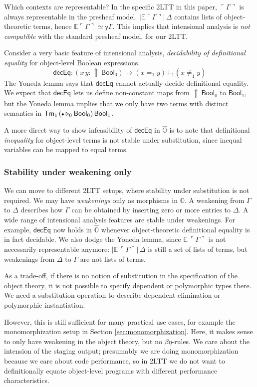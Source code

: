 \documentclass[acmsmall,review]{acmart}
\newcommand{\msf}[1]{\mathsf{#1}}
\newcommand{\mbb}[1]{\mathbb{#1}}
\newcommand{\ext}{\triangleright}
\newcommand{\Lift}{{\Uparrow}}
\newcommand{\mbbo}{\mbb{O}}
\newcommand{\Tm}{\msf{Tm}}
\newcommand{\Bool}{\msf{Bool}}
\newcommand{\emptycon}{\scaleobj{.75}\bullet}
\newcommand{\emb}[1]{\ulcorner#1\urcorner}
\newcommand{\hato}{\bm\hat{\mbbo}}
\newcommand{\ev}{\mbb{E}}
\theoremstyle{remark}
\newcommand{\yon}{\msf{y}}
\begin{document}
Which contexts are representable? In the specific 2LTT in this paper,
$\emb{\Gamma}$ is always representable in the presheaf
model. $|\ev{\emb{\Gamma}}|\,\Delta$ contains lists of object-theoretic terms,
hence $\ev{\emb{\Gamma}} \simeq \yon \Gamma$.  This implies that intensional
analysis is \emph{not compatible} with the standard presheaf model, for our
2LTT.

Consider a very basic feature of intensional analysis, \emph{decidability of
definitional equality} for object-level Boolean expressions.
\[
  \msf{decEq} : (x\,y : \Lift\,\Bool_0) \to (x =_1 y) +_1 (x \neq_1 y)
\]
The Yoneda lemma says that $\msf{decEq}$ cannot actually decide
definitional equality. We expect that $\msf{decEq}$ lets us define non-constant
maps from $\Lift\,\Bool_0$ to $\Bool_1$, but the Yoneda lemma implies that we
only have two terms with distinct semantics in $\Tm_1\,(\emptycon \ext_0
\Bool_0)\,\Bool_1$.

A more direct way to show infeasibility of $\msf{decEq}$ in $\hato$ is to note
that definitional \emph{inequality} for object-level terms is not stable under
substitution, since inequal variables can be mapped to equal terms.

\subsubsection{Stability under weakening only}
We can move to different 2LTT setups, where stability under substitution is not
required. We may have \emph{weakenings} only as morphisms in $\mbbo$.  A
weakening from $\Gamma$ to $\Delta$ describes how $\Gamma$ can be obtained by
inserting zero or more entries to $\Delta$. A wide range of intensional analysis
features are stable under weakenings. For example, $\msf{decEq}$ now holds in
$\hato$ whenever object-theoretic definitional equality is in fact decidable.
We also dodge the Yoneda lemma, since $\ev\,\emb{\Gamma}$ is not necessarily
representable anymore: $|\ev\,\emb{\Gamma}|\,\Delta$ is still a set of lists of
terms, but weakenings from $\Delta$ to $\Gamma$ are not lists of terms.

As a trade-off, if there is no notion of substitution in the specification of the
object theory, it is not possible to specify dependent or polymorphic types
there. We need a substitution operation to describe dependent elimination or
polymorphic instantiation.

However, this is still sufficient for many practical use cases, for example the
monomorphization setup in Section \ref{sec:monomorphization}. Here, it makes sense to only
have weakening in the object theory, but no $\beta\eta$-rules. We care about
the intension of the staging output; presumably we are doing monomorphization
because we care about code performance, so in 2LTT we do not want to
definitionally equate object-level programs with different performance
characteristics.
\end{document}
